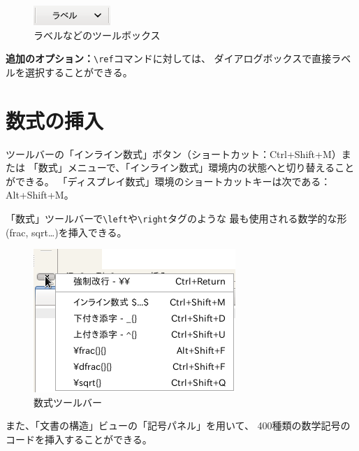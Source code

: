 \begin{figure}[H]
  \centering
  \includegraphics{doc10.png}
  \caption{ラベルなどのツールボックス}
\end{figure}

\textbf{追加のオプション：}\verb+\ref+コマンドに対しては、
ダイアログボックスで直接ラベルを選択することができる。

\section{数式の挿入}

ツールバーの「インライン数式」ボタン（ショートカット：Ctrl+Shift+M）または
「数式」メニューで、「インライン数式」環境内の状態へと切り替えることができる。
「ディスプレイ数式」環境のショートカットキーは次である：Alt+Shift+M。

「数式」ツールバーで\verb+\left+や\verb+\right+タグのような
最も使用される数学的な形(frac, sqrt\ldots{})を挿入できる。

\begin{figure}[H]
  \centering
  \includegraphics{doc11.png}
  \caption{数式ツールバー}
\end{figure}

また、「文書の構造」ビューの「記号パネル」を用いて、
400種類の数学記号のコードを挿入することができる。

